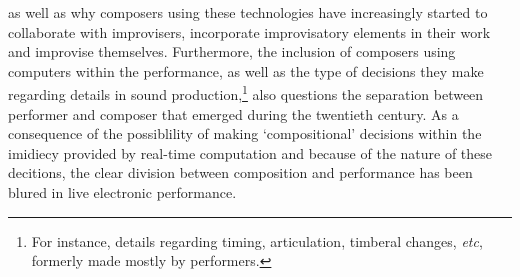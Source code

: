 as well as why composers using these technologies have increasingly started to collaborate with improvisers, incorporate improvisatory elements in their work and improvise themselves.
Furthermore, the inclusion of composers using computers within the performance, as well as the type of decisions they make regarding details in sound production,\footnote{For instance, details regarding timing, articulation, timberal changes, \emph{etc}, formerly made mostly by performers.} also questions the separation between performer and composer that emerged during the twentieth century. As a consequence of the possiblility of making `compositional' decisions within the imidiecy provided by real-time computation and because of the nature of these decitions, the clear division between composition and performance has been blured in live electronic performance. 


